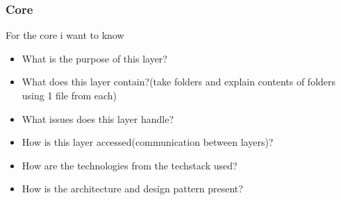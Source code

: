 \subsubsection{Core}
For the core i want to know
\begin{itemize}
    \item What is the purpose of this layer?
    \item What does this layer contain?(take folders and explain contents of folders using 1 file from each)
    \item What issues does this layer handle?
    \item How is this layer accessed(communication between layers)?
    \item How are the technologies from the techstack used?
    \item How is the architecture and design pattern present?
\end{itemize}
